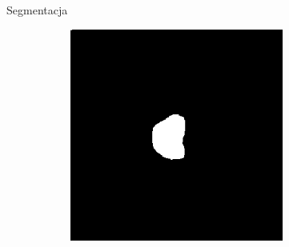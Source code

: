 \documentclass[final]{beamer}
\newlength{\onecolwid}
\newlength{\threecolwid}
\begin{document}
\begin{frame}[t]
\begin{columns}[t]
\begin{column}{\threecolwid}
\begin{columns}[t,totalwidth=\threecolwid]
\begin{column}{\onecolwid}
\begin{block}{Segmentacja}
\begin{figure}[htb]
\begin{subfigure}{}
                        \label{fig:2}
                    \end{subfigure}\hfil %
                    \begin{subfigure}{}
                        \includegraphics[width=7cm,angle=270,origin=c]{../segmentation/pred_mask_1.png}
                        \label{fig:3}
                    \end{subfigure}
                    

\end{figure}
\end{block}
\end{column}
\end{columns}
\end{column}
\end{columns}
\end{frame}
\end{document}
